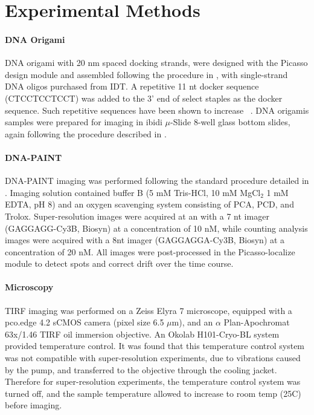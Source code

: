 \section{Experimental Methods}


\paragraph{DNA Origami}
DNA origami with 20 nm spaced docking strands, were designed with the Picasso design module \cite{schnitzbauer_2017}
and assembled following the procedure in \cite{schnitzbauer_2017}, with single-strand DNA oligos purchased from IDT.
  A repetitive 11 nt docker sequence (CTCCTCCTCCT) was added to the 3' end of select staples as the docker sequence.
  Such repetitive sequences have been shown to increase \pon~\citep{civitci_2020}.
  DNA origamis samples were prepared for imaging in ibidi $\mu$-Slide 8-well glass bottom slides, 
  again following the procedure described in \cite{schnitzbauer_2017}. 
  
\paragraph{DNA-PAINT}
DNA-PAINT imaging was performed following the standard procedure detailed in \cite{schnitzbauer_2017}. 
  Imaging solution contained buffer B (5 mM Tris-HCl, 10 mM MgCl$_2$ 1 mM EDTA, pH 8) and an oxygen scavenging system consisting of PCA, PCD, and Trolox.
  Super-resolution images were acquired at an with a 7 nt imager (GAGGAGG-Cy3B, Biosyn) at a concentration of 10 nM,
  while counting analysis images were acquired with a 8nt imager (GAGGAGGA-Cy3B, Biosyn) at a concentration of 20 nM.
  All images were post-processed in the Picasso-localize module to detect spots and correct drift over the time course. 

\paragraph{Microscopy}

TIRF imaging was performed on a Zeiss Elyra 7 microscope, equipped with 
a pco.edge 4.2 sCMOS camera (pixel size 6.5 $\mu$m), and an $\alpha$ 
Plan-Apochromat 63x/1.46 TIRF oil immersion objective.
  An Okolab H101-Cryo-BL system provided temperature control. 
  It was found that this temperature control system was not compatible with super-resolution experiments, 
  due to vibrations caused by the pump, and transferred to the objective through the cooling jacket.
  Therefore for super-resolution experiments, the temperature control system was turned off, 
  and the sample temperature allowed to increase to room temp (25\textdegree C) before imaging.